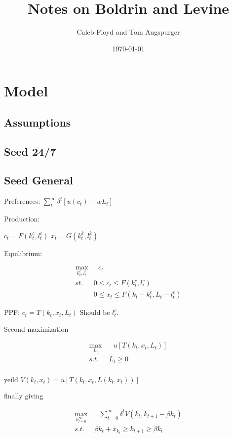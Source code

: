 \documentclass[11pt]{article}
\title{Notes on Boldrin and Levine}
\author{Caleb Floyd and Tom Augspurger}
\date{\today}
\begin{document}
\maketitle

\section{Model}
\label{sec:model}

\subsection{Assumptions}
\label{sub:assumptions}

\subsection{Seed 24/7}
\label{sub:seed_24_7}

\subsection{Seed General}
\label{sub:seed_general}

  Preferences: $\sum_t^\infty \delta^t [u(c_t) - wL_t]$

  Production:

  $c_t = F(k_t^c, l_t^c)$
  $x_t = G(k_t^k, l_t^k)$

  Equilibrium:

  \begin{align}
    \max_{k^c_t, l^c_t} & \ \ \ c_t\\
    st. & 0 \leq c_t \leq F(k_t^c, l_t^c)\\
        & 0 \leq x_t \leq F(k_t - k_t^c, L_t - l_t^c)
  \end{align}

  PPF: $c_t = T(k_t, x_t, L_t)$ Should be $l^c_t$.

  Second maximization

  \begin{align}
    \max_{L_t} & \ \ \  u[T(k_t, x_t, L_t)] \\
    s.t. \ \ \ & L_t \geq 0\\
  \end{align}

  yeild $V(k_t, x_t) = u[T(k_t, x_t, L(k_t, x_t))]$

  finally giving

  \begin{align}
    \max_{k_{t=0}^\infty} & \ \ \ \sum_{t=0}^{\infty} \delta^t V(k_t, k_{t+1} - \beta k_t)\\
    s.t. \ \ \ & \beta k_t + \bar{x}_{k_t} \geq k_{t+1} \geq \beta k_t
  \end{align}
\end{document}
